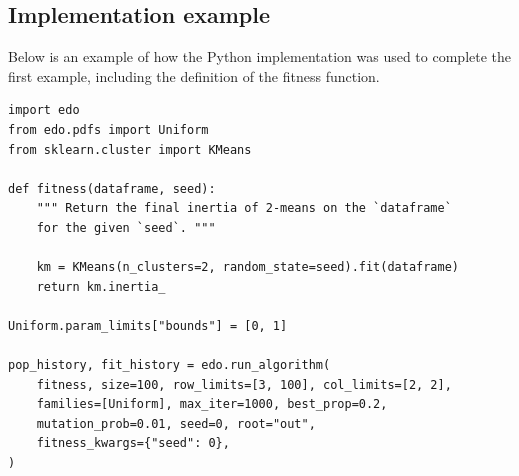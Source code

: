 \documentclass[smallextended]{svjour3}
\begin{document}
\subsection{Implementation example}\label{app:code}

Below is an example of how the Python implementation was used to complete the
first example, including the definition of the fitness function.

\begin{lstlisting}
import edo
from edo.pdfs import Uniform
from sklearn.cluster import KMeans

def fitness(dataframe, seed):
    """ Return the final inertia of 2-means on the `dataframe`
    for the given `seed`. """

    km = KMeans(n_clusters=2, random_state=seed).fit(dataframe)
    return km.inertia_

Uniform.param_limits["bounds"] = [0, 1]

pop_history, fit_history = edo.run_algorithm(
    fitness, size=100, row_limits=[3, 100], col_limits=[2, 2],
    families=[Uniform], max_iter=1000, best_prop=0.2,
    mutation_prob=0.01, seed=0, root="out",
    fitness_kwargs={"seed": 0},
)
\end{lstlisting}
\end{document}
